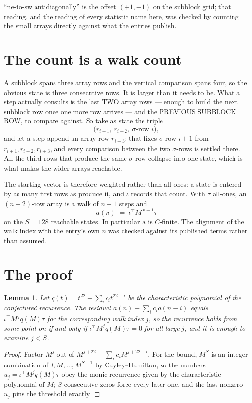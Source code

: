 \documentclass[11pt,a4paper]{article}
\theoremstyle{plain}
\newtheorem{lemma}[theorem]{Lemma}
\theoremstyle{definition}
\begin{document}
``ne-to-sw antidiagonally'' is the offset $(+1,-1)$ on the subblock grid; that reading, and
the reading of every statistic name here, was checked by counting the small arrays directly
against what the entries publish.

\section{The count is a walk count}

A subblock spans three array rows and the vertical comparison spans four, so the obvious state
is three consecutive rows. It is larger than it needs to be. What a step actually consults is
the last TWO array rows --- enough to build the next subblock row once one more row arrives ---
and the PREVIOUS SUBBLOCK ROW, to compare against. So take as state the triple
\[
\bigl(r_{i+1},\ r_{i+2},\ \sigma\text{-row }i\bigr),
\]
and let a step append an array row $r_{i+3}$: that fixes $\sigma$-row $i+1$ from
$r_{i+1},r_{i+2},r_{i+3}$, and every comparison between the two $\sigma$-rows is settled
there. All the third rows that produce the same $\sigma$-row collapse into one state, which is
what makes the wider arrays reachable.

The starting vector is therefore weighted rather than all-ones: a state is entered by as many
first rows as produce it, and $\iota$ records that count. With $\tau$ all-ones, an
$(n+2)$-row array is a walk of $n-1$ steps and
\[
a(n)\;=\;\iota^{\!\top}M^{\,n-1}\tau
\]
on the $S=128$ reachable states. In particular $a$ is $C$-finite. The alignment of the walk
index with the entry's own $n$ was checked against its published terms rather than assumed.

\section{The proof}

\begin{lemma}\label{lem:crit}
Let $q(t)=t^{22}-\sum_i c_it^{22-i}$ be the characteristic polynomial of the
conjectured recurrence. The residual $a(n)-\sum_ic_ia(n-i)$ equals
$\iota^{\!\top}M^{\,j}q(M)\tau$ for the corresponding walk index $j$, so the recurrence
holds from some point on if and only if $\iota^{\!\top}M^{j}q(M)\tau=0$ for all large $j$,
and it is enough to examine $j<S$.
\end{lemma}

\begin{proof}
Factor $M^{j}$ out of $M^{j+22}-\sum_ic_iM^{j+22-i}$. For the bound, $M^{S}$
is an integer combination of $I,M,\dots,M^{S-1}$ by Cayley--Hamilton, so the numbers
$u_j=\iota^{\!\top}M^{j}q(M)\tau$ obey the monic recurrence given by the characteristic
polynomial of $M$; $S$ consecutive zeros force every later one, and the last nonzero $u_j$
pins the threshold exactly.
\end{proof}
\end{document}
